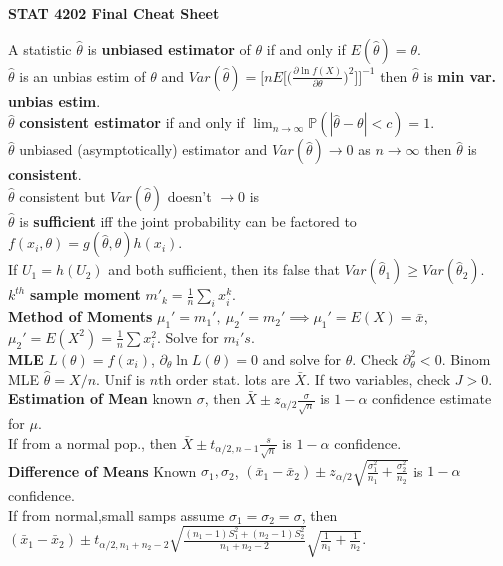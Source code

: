\documentclass[10pt]{article}
\begin{document}
\maketitle


\begin{center}{\bf STAT 4202 Final Cheat Sheet}\end{center}
A statistic $\hat\theta$ is {\bf unbiased estimator} of $\theta$ if and only if $E(\hat\theta)=\theta$.\\
$\hat\theta$ is an unbias estim of $\theta$ and $Var(\hat\theta)=\Big[n E\Big[\Big(\frac{\partial\ln f(X)}{\partial \theta}\Big)^2\Big]\Big]^{-1}$ then $\hat\theta $ is {\bf min var. unbias estim}.\\
$\hat\theta$ {\bf consistent estimator} if and only if $\lim_{n\to\infty}\mathbb P(|\hat\theta-\theta|<c)=1$.\\
$\hat\theta$ unbiased (asymptotically) estimator and $Var(\hat\theta)\to0$ as $n\to\infty$ then $\hat\theta$ is {\bf consistent}.\\
$\hat\theta$ consistent but $Var(\hat\theta)$ doesn't $\to0$ is \\
$\hat\theta$ is {\bf sufficient }iff the joint probability can be factored to $f(x_i,\theta)=g(\hat\theta,\theta)h(x_i)$.\\
If $U_1=h(U_2)$ and both sufficient, then its false that $Var(\hat\theta_1)\geq Var(\hat\theta_2)$.\\
$k^{th}$ {\bf sample moment} $m'_k=\frac{1}{n}\sum_i x_i^k$.\\
{\bf Method of Moments} $\mu_1'=m_1',\ \mu_2'=m_2'\implies \mu_1'=E(X)=\bar x$, $\mu_2'=E(X^2)=\frac{1}{n}\sum x_i^2$. Solve for $m_i's$.\\
{\bf MLE} $L(\theta)=f(x_i)$, $\partial_{\theta}\ln L(\theta)=0$ and solve for $\theta$. Check $\partial^2_{\theta}<0$. Binom MLE $\hat\theta=X/n$. Unif is $n$th order stat. lots are $\bar X$. If two variables, check $J>0$.\\
{\bf Estimation of Mean} known $\sigma$, then $\bar X\pm z_{\alpha/2}\frac{\sigma}{\sqrt n}$ is $1-\alpha$ confidence estimate for $\mu$.\\
If from a normal pop., then $\bar X\pm t_{\alpha/2,n-1}\frac{s}{\sqrt n}$ is $1-\alpha$ confidence.\\
{\bf Difference of Means} Known $\sigma_1,\sigma_2$, $(\bar x_1-\bar x_2)\pm z_{\alpha/2}\sqrt{\frac{\sigma_1^2}{n_1}+\frac{\sigma_2^2}{n_2}}$ is $1-\alpha$ confidence.\\
If from normal,small samps assume $\sigma_1=\sigma_2=\sigma$, then $(\bar x_1-\bar x_2)\pm t_{\alpha/2,n_1+n_2-2}\sqrt{\frac{(n_1-1)S_1^2+(n_2-1)S_2^2}{n_1+n_2-2}}\sqrt{\frac{1}{n_1}+\frac{1}{n_2}}$.\\
\end{document}
